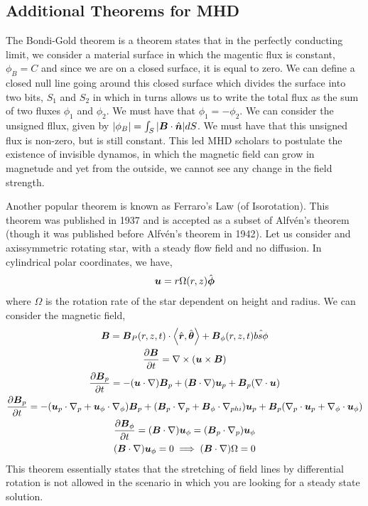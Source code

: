 \documentclass{article}
\begin{document}
\subsection{Additional Theorems for MHD}

The Bondi-Gold theorem is a theorem states that in the perfectly conducting
limit, we consider a material surface in which the magentic flux is constant,
$\phi_B = C$ and since we are on a closed surface, it is equal to zero. 
We can define a closed null line going around this closed surface which divides
the surface into two bits, $S_1$ and $S_2$ in which in turns allows us to write
the total flux as the sum of two fluxes $\phi_1$ and $\phi_2$. We must have that
$\phi_1 = - \phi_2$. We can consider the unsigned fllux, given by $|\phi_B| =
\int_S |\boldsymbol{B}\cdot\hat{\boldsymbol{n}}| dS$. We must have that this unsigned flux is non-zero, but
is still constant. This led MHD scholars to postulate the existence of invisible
dynamos, in which the magnetic field can grow in magnetude and yet from the
outside, we cannot see any change in the field strength. 


Another popular theorem is known as Ferraro's Law (of Isorotation). This theorem
was published in 1937 and is accepted as a subset of Alfv\'en's theorem (though it
was published before Alfv\'en's theorem in 1942). Let us consider and
axissymmetric rotating star, with a steady flow field and no diffusion. In
cylindrical polar coordinates, we have, 
\begin{gather*}
    \boldsymbol{u} = r\Omega(r, z)\hat{\boldsymbol{\phi}}
\end{gather*}
where $\Omega$ is the rotation rate of the star dependent on height and radius.
We can consider the magnetic field, 
\begin{gather*}
    \boldsymbol{B} = \boldsymbol{B}_P (r, z, t) \cdot \left<\hat{\boldsymbol{r}}, \hat{\boldsymbol{\theta}}\right> +
    \boldsymbol{B}_{\phi} (r, z, t) \hat{bs{\phi}}\\
    \frac{\partial \boldsymbol{B}}{\partial t} = \nabla\times(\boldsymbol{u}\times\boldsymbol{B})\\
    \frac{\partial \boldsymbol{B}_p}{\partial t} = -(\boldsymbol{u}\cdot\nabla)\boldsymbol{B}_p + (\boldsymbol{B}\cdot\nabla)\boldsymbol{u}_p + \boldsymbol{B}_p(\nabla \cdot{\boldsymbol{u}})\\
    \frac{\partial \boldsymbol{B}_p}{\partial t} = -(\boldsymbol{u}_p\cdot\nabla_p + \boldsymbol{u}_{\phi} \cdot\nabla_{\phi})\boldsymbol{B}_p +
    (\boldsymbol{B}_p\cdot\nabla_p + \boldsymbol{B}_{\phi}\cdot\nabla_{phi})\boldsymbol{u}_p +
    \boldsymbol{B}_p(\nabla_p\cdot\boldsymbol{u}_p + \nabla_{\phi}\cdot\boldsymbol{u}_{\phi})\\
    \frac{\partial \boldsymbol{B}_{\phi}}{\partial t} = (\boldsymbol{B}\cdot\nabla)\boldsymbol{u}_{\phi} =
    (\boldsymbol{B}_p\cdot\nabla_p)\boldsymbol{u}_{\phi}\\
    (\boldsymbol{B}\cdot\nabla)\boldsymbol{u}_{\phi} = 0 \implies (\boldsymbol{B}\cdot\nabla)\Omega = 0
\end{gather*}
This theorem essentially states that the stretching of field lines by
differential rotation is not allowed in the scenario in which you are looking
for a steady state solution. 
\end{document}
